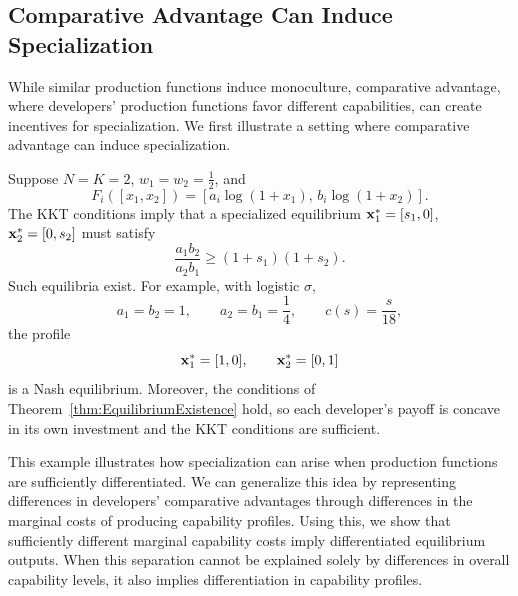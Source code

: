 \subsection{Comparative Advantage Can Induce Specialization}
While similar production functions induce monoculture, comparative advantage, where developers' production functions favor different capabilities, can create incentives for specialization.
We first illustrate a setting where comparative advantage can induce specialization. 

\begin{example}
\label{ex:comparative_advantage}
Suppose $N=K=2$, $w_1=w_2=\frac12$, and
\[
F_i([x_1,x_2])
=
[a_i\log(1+x_1),\,b_i\log(1+x_2)].
\]
The KKT conditions imply that a specialized equilibrium
$\mathbf{x}_1^*=[s_1,0]$, $\mathbf{x}_2^*=[0,s_2]$ must satisfy
\[
\frac{a_1b_2}{a_2b_1}
\geq
(1+s_1)(1+s_2).
\]
Such equilibria exist. 
For example, with logistic $\sigma$,
\[
a_1=b_2=1,\qquad
a_2=b_1=\frac14,\qquad
c(s)=\frac{s}{18},
\]
the profile
\[
\mathbf{x}_1^*=[1,0],
\qquad
\mathbf{x}_2^*=[0,1]
\]
is a Nash equilibrium. 
Moreover, the conditions of Theorem~\ref{thm:EquilibriumExistence} hold, so each developer's payoff is concave in its own investment and the KKT conditions are sufficient.
\end{example}

This example illustrates how specialization can arise when production functions are sufficiently differentiated.
We can generalize this idea by representing differences in developers' comparative advantages through differences in the marginal costs of producing capability profiles. 
Using this, we show that sufficiently different marginal capability costs imply differentiated equilibrium outputs.
When this separation cannot be explained solely by differences in overall capability levels, it also implies differentiation in capability profiles.

